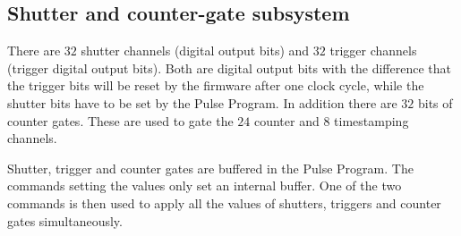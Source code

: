 \documentclass[11pt]{scrartcl}
\begin{document}
\subsection{Shutter and counter-gate subsystem}
There are $32$ shutter channels (digital output bits) and $32$ trigger channels (trigger digital output bits). Both are digital output bits with the difference that the trigger bits will be reset by the firmware after one clock cycle, while the shutter bits have to be set by the Pulse Program. In addition there are $32$ bits of counter gates. These are used to gate the $24$ counter and $8$ timestamping channels.

Shutter, trigger and counter gates are buffered in the Pulse Program. The commands setting the values only set an internal buffer. One of the two  commands is then used to apply all the values of shutters, triggers and counter gates simultaneously.
\end{document}
